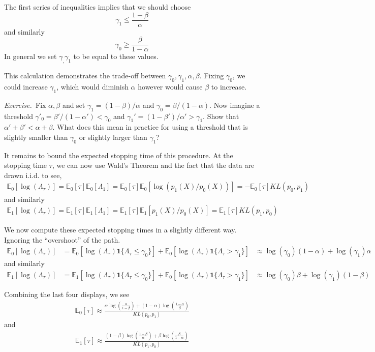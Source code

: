 \documentclass[11pt]{article}
\newcommand{\exercise}{\noindent\textit{Exercise.\  }}
\newcommand{\E}{\mathbb{E}}
\newcommand{\1}{\mathbf{1}}
\begin{document}
The first series of inequalities implies that we should choose
\[\gamma_1 \leq \frac{1-\beta}{\alpha}\]
and similarly
\[\gamma_0 \geq \frac{\beta}{1-\alpha}\]
In general we set $\gamma_, \gamma_1$ to be equal to these values. 

This calculation demonstrates the trade-off between $\gamma_0, \gamma_1, \alpha, \beta$. Fixing $\gamma_0$, we could increase $\gamma_1$, which would diminish $\alpha$ however would cause $\beta$ to increase.  

\exercise Fix $\alpha, \beta$ and set $\gamma_1 = (1-\beta)/\alpha$ and $\gamma_0=\beta/(1-\alpha)$. Now imagine a threshold $\gamma'_0 = \beta'/(1-\alpha') < \gamma_0$ and $\gamma_1' = (1-\beta')/\alpha' > \gamma_1$. Show that $\alpha'+\beta' < \alpha+\beta$. What does this mean in practice for using a threshold that is slightly smaller than $\gamma_0$ or slightly larger than $\gamma_1$?



It remains to bound the expected stopping time of this procedure. At the stopping time $\tau$, we can now use Wald's Theorem and the fact that the data are drawn i.i.d. to see,
\begin{align*}
\E_0[\log(\Lambda_{\tau})] = \E_0[\tau] \E_0[\Lambda_1] = \E_0[\tau] \E_0[\log(p_1(X)/p_0(X))] = -\E_0[\tau] KL(p_0, p_1)
\end{align*}
and similarly
\begin{align*}
\E_1[\log(\Lambda_{\tau})] = \E_1[\tau] \E_1[\Lambda_1] = \E_1[\tau] \E_1[p_1(X)/p_0(X)] = \E_1[\tau] KL(p_1, p_0)
\end{align*}

We now compute these expected stopping times in a slightly different way. Ignoring the ``overshoot'' of the path.
\begin{align*}
\E_0[\log(\Lambda_{\tau})]
&= \E_0[\log(\Lambda_{\tau})\1\{\Lambda_{\tau} \leq \gamma_0\}] + \E_0[\log(\Lambda_{\tau})\1\{\Lambda_{\tau} > \gamma_1\}]
&\approx \log(\gamma_0)(1-\alpha) + \log(\gamma_1)\alpha
\end{align*}
and similarly
\begin{align*}
\E_1[\log(\Lambda_{\tau})]
&= \E_1[\log(\Lambda_{\tau})\1\{\Lambda_{\tau} \leq \gamma_0\}] + \E_0[\log(\Lambda_{\tau})\1\{\Lambda_{\tau} > \gamma_1\}]
&\approx \log(\gamma_0)\beta + \log(\gamma_1)(1-\beta)
\end{align*}

Combining the last four displays, we see
\begin{align*}
    \E_0[\tau] \approx \frac{\alpha \log\left(\frac{\alpha}{1-\beta}\right) + (1-\alpha) \log\left(\frac{1-\alpha}{\beta}\right)}{KL(p_0,p_1)}
\end{align*}
and 
\begin{align*}
    \E_1[\tau] \approx \frac{(1-\beta) \log\left(\frac{1-\beta}{\alpha}\right) + \beta \log\left(\frac{\beta}{1-\alpha}\right)}{KL(p_1,p_0)}
\end{align*}
\end{document}

